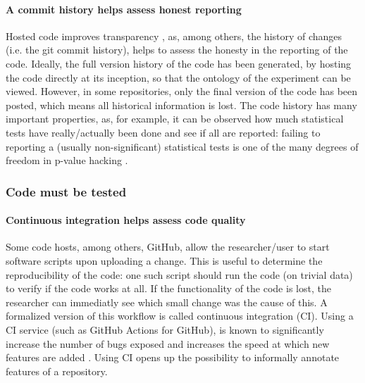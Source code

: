\paragraph{A commit history helps assess honest reporting}

Hosted code improves transparency \cite{gorgolewski2016practical},
as, among others, the history of changes (i.e. the git commit history), 
helps to assess the honesty in the reporting of the code. 
Ideally, the full version history of the code 
has been generated, by hosting the code directly at its inception,
so that the ontology of the experiment can be viewed.
However, in some repositories, only the final version of the code has been
posted, which means all historical information is lost.
The code history has many important properties,
as, for example, 
it can be observed how much statistical tests have really/actually been done 
and see if all are reported:
failing to reporting a (usually non-significant) statistical tests is 
one of the many degrees of freedom 
in p-value hacking \cite{wicherts2016degrees}.

\subsubsection{Code must be tested}



\paragraph{Continuous integration helps assess code quality}

Some code hosts, among others, GitHub, 
allow the researcher/user to start software scripts upon uploading a change.
This is useful to determine the reproducibility of the code: 
one such script should run the code (on trivial data) 
to verify if the code works at all.
If the functionality of the code is lost, the researcher
can immediatly see which small change was the cause of this.
A formalized version of this workflow is called continuous integration (CI).
Using a CI service (such as GitHub Actions for GitHub), 
is known to significantly 
increase the number of bugs exposed \cite{vasilescu2015} and increases
the speed at which new features are added \cite{vasilescu2015}.
Using CI opens up the possibility to informally annotate features of
a repository. 

